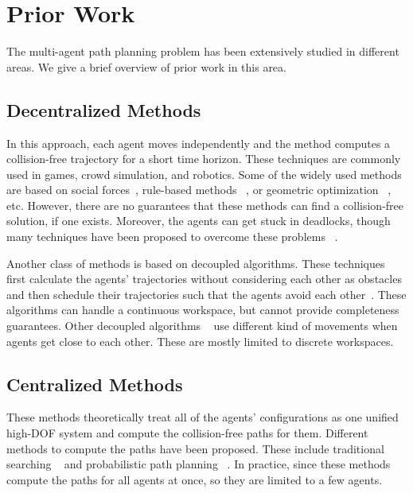 \section{Prior Work}

The multi-agent path planning problem has been extensively studied in different areas. We give a brief overview of prior work in this area. 

\subsection{Decentralized Methods}
In this approach, each agent moves independently and the method computes a collision-free trajectory for a short time horizon. These techniques are commonly used in games, crowd simulation, and robotics. Some of the widely used methods are based on social forces~\cite{helbing1995social}, rule-based methods ~\cite{pelechano2007controlling}, or geometric optimization ~\cite{yeh2008composite,van2011reciprocal}, etc. However, there are no guarantees that these methods can find a collision-free solution, if one exists. Moreover, the agents can get stuck in deadlocks, though many techniques have been proposed to overcome these problems ~\cite{he2013meso,kimmel2012maintaining}. 

Another class of methods is based on decoupled algorithms. These techniques first calculate the agents' trajectories without considering each other as obstacles and then schedule their trajectories such that the agents avoid each other~\cite{cui2012pareto,sanchez2002using,peng2005coordinating,velagapudi2010decentralized}. These algorithms can handle a continuous workspace, but cannot provide completeness guarantees.  
Other decoupled algorithms ~\cite{luna2011push,de2013push,sajid2012multi} use different kind of movements when agents get close to each other. These are mostly limited to discrete workspaces.

\subsection{Centralized Methods}
These methods theoretically treat all of the agents' configurations as one unified high-DOF system and compute the collision-free paths for them. Different methods to compute the paths have been proposed. These include traditional searching ~\cite{katsev2013efficient,hart1968formal,korf1985depth,felner2012partial} and  probabilistic path planning ~\cite{carpin2002parallel,ferguson2006replanning,ferner2013odrm}. In practice, since these methods compute the paths for all agents at once, so they are limited to a few agents.


